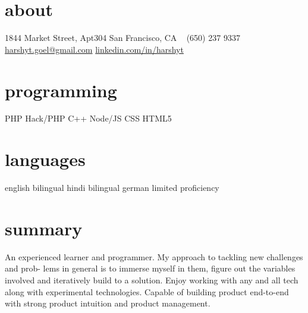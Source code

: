\documentclass[print]{friggeri-cv} %
\begin{document}


\begin{aside} %
\section{about}
1844 Market Street, Apt304
San Francisco, CA 
~
(650) 237 9337
\href{mailto:harshyt.goel@gmail.com}{harshyt.goel@gmail.com}
\href{https://www.linkedin.com/in/harshyt}{linkedin.com/in/harshyt}
\section{programming}
PHP
Hack/PHP
C++
Node/JS
CSS
HTML5
\section{languages}
english bilingual
hindi bilingual
german limited proficiency
\end{aside}

\section{summary}
An experienced learner and programmer. My approach to tackling new challenges and prob- lems in general is to immerse myself in them, figure out the variables involved and iteratively build to a solution. Enjoy working with any and all tech along with experimental technologies. Capable of building product end-to-end with strong product intuition and product management.

\end{document}
